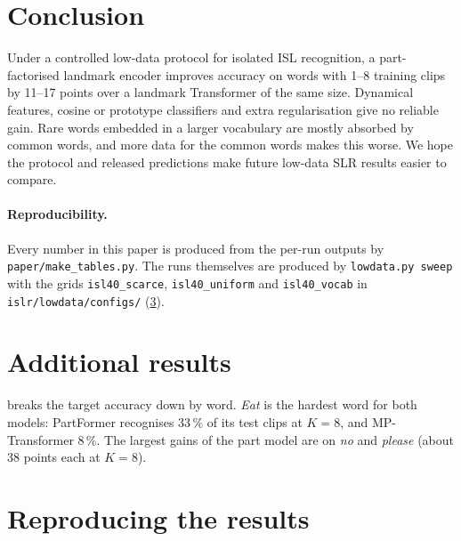 \documentclass[11pt]{article}
\begin{document}
\section{Conclusion}

Under a controlled low-data protocol for isolated ISL recognition, a part-factorised
landmark encoder improves accuracy on words with 1--8 training clips by 11--17 points over a
landmark Transformer of the same size. Dynamical features, cosine or prototype classifiers
and extra regularisation give no reliable gain. Rare words embedded in a larger vocabulary
are mostly absorbed by common words, and more data for the common words makes this worse. We
hope the protocol and released predictions make future low-data SLR results easier to
compare.

\paragraph{Reproducibility.}
Every number in this paper is produced from the per-run outputs by
\texttt{paper/make\_tables.py}. The runs themselves are produced by
\texttt{lowdata.py sweep} with the grids \texttt{isl40\_scarce}, \texttt{isl40\_uniform} and \texttt{isl40\_vocab} in \texttt{islr/lowdata/configs/}
(\cref{app:repro}).




\clearpage
\appendix
\section{Additional results}







 breaks the target accuracy down by word. \emph{Eat} is the hardest word
for both models: PartFormer recognises 33\,\% of its test clips at $K{=}8$, and MP-Transformer
8\,\%. The largest gains of the part model are on \emph{no} and \emph{please} (about 38 points each at $K{=}8$).

\FloatBarrier
\section{Reproducing the results}\label{app:repro}
\end{document}
